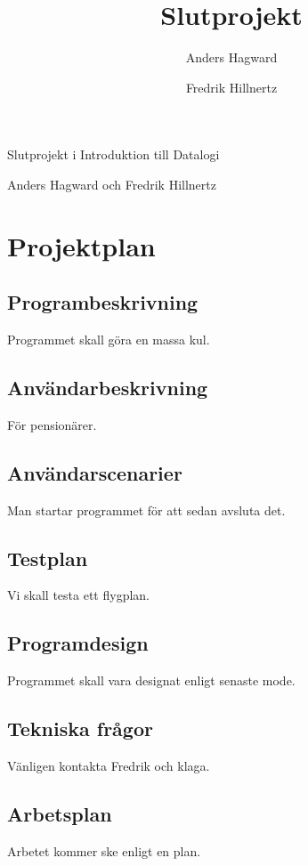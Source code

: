 \documentclass[11pt,a4paper]{article}
\author{Anders Hagward \and Fredrik Hillnertz}
\title{Slutprojekt}
\begin{document}
\thispagestyle{empty}
\begin{center}
\huge Slutprojekt i Introduktion till Datalogi

\normalsize Anders Hagward och Fredrik Hillnertz
\end{center}
\newpage

\tableofcontents
\newpage

\section{Projektplan}

\subsection{Programbeskrivning}
Programmet skall göra en massa kul.

\subsection{Användarbeskrivning}
För pensionärer.

\subsection{Användarscenarier}
Man startar programmet för att sedan avsluta det.

\subsection{Testplan}
Vi skall testa ett flygplan.

\subsection{Programdesign}
Programmet skall vara designat enligt senaste mode.

\subsection{Tekniska frågor}
Vänligen kontakta Fredrik och klaga.

\subsection{Arbetsplan}
Arbetet kommer ske enligt en plan.
\end{document}
